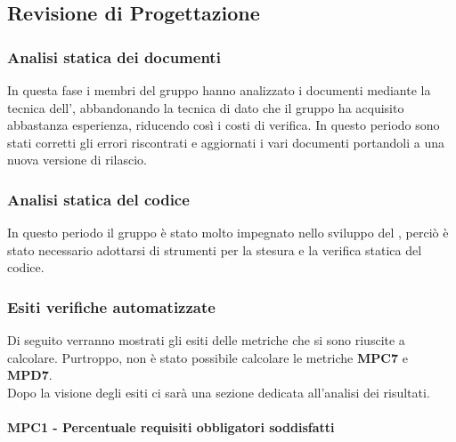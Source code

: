 \subsection{Revisione di Progettazione}
\subsubsection{Analisi statica dei documenti}
In questa fase i membri del gruppo \Gruppo{} hanno analizzato i documenti mediante la tecnica dell', abbandonando la tecnica di  dato che il gruppo ha acquisito abbastanza esperienza, riducendo così i costi di verifica. In questo periodo sono stati corretti gli errori riscontrati e aggiornati i vari documenti portandoli a una nuova versione di rilascio.

\subsubsection{Analisi statica del codice}
In questo periodo il gruppo è stato molto impegnato nello sviluppo del , perciò è stato necessario adottarsi di strumenti per la stesura e la verifica statica del codice. 

\subsubsection{Esiti verifiche automatizzate}
Di seguito verranno mostrati gli esiti delle metriche che si sono riuscite a calcolare. Purtroppo, non è stato possibile calcolare le metriche \textbf{MPC7} e \textbf{MPD7}. \\ Dopo la visione degli esiti ci sarà una sezione dedicata all'analisi dei risultati.

\paragraph{MPC1 - Percentuale requisiti obbligatori soddisfatti} 

\pgfplotsset{width=16cm, height=8cm}

